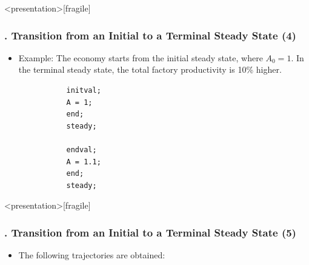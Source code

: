 \documentclass[11pt,aspectratio=169]{beamer}
\begin{document}
\begin{frame}<presentation>[fragile]
	\frametitle{{\thesection.\thesubsection\thinspace\thesubsubsection} Transition from an Initial to a Terminal Steady State (4)}
	\begin{itemize}
		\item Example: The economy starts from the initial steady state, where $A_0=1$. In the terminal steady state, the total factory productivity is 10\% higher.
		\begin{verbatim}
		   initval;
		   A = 1;
		   end; 
		   steady;
		
		   endval;
		   A = 1.1;
		   end;
		   steady;
		\end{verbatim}
	\end{itemize}
\end{frame}
\begin{frame}<presentation>[fragile]
	\frametitle{{\thesection.\thesubsection\thinspace\thesubsubsection} Transition from an Initial to a Terminal Steady State (5)}
	\begin{itemize}
		\item The following trajectories are obtained:
		\begin{figure}
			\centering
			\qquad
			\qquad
		\end{figure}
	\end{itemize}
\end{frame}
\end{document}
